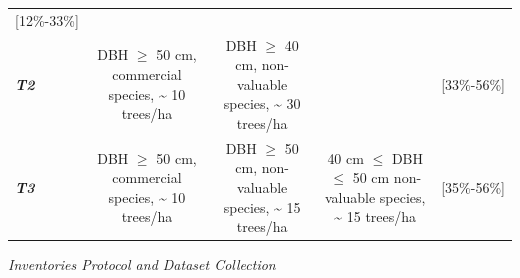 \documentclass[fleqn,10pt]{ArtEcoFoG} %
\begin{document}
\begin{longtable}[]{@{}lcccc@{}}
\begin{minipage}[t]{0.12\columnwidth}
{[}12\%-33\%{]}\strut
\end{minipage}\tabularnewline
\begin{minipage}[t]{0.14\columnwidth}\raggedright\strut
\textbf{\emph{T2}}\strut
\end{minipage} & \begin{minipage}[t]{0.17\columnwidth}\centering\strut
DBH \(\geq\) 50 cm, commercial species, \textasciitilde{} 10
trees/ha\strut
\end{minipage} & \begin{minipage}[t]{0.18\columnwidth}\centering\strut
DBH \(\geq\) 40 cm, non-valuable species, \textasciitilde{} 30
trees/ha\strut
\end{minipage} & \begin{minipage}[t]{0.24\columnwidth}\centering\strut
\strut
\end{minipage} & \begin{minipage}[t]{0.12\columnwidth}\centering\strut
{[}33\%-56\%{]}\strut
\end{minipage}\tabularnewline
\begin{minipage}[t]{0.14\columnwidth}\raggedright\strut
\textbf{\emph{T3}}\strut
\end{minipage} & \begin{minipage}[t]{0.17\columnwidth}\centering\strut
DBH \(\geq\) 50 cm, commercial species, \textasciitilde{} 10
trees/ha\strut
\end{minipage} & \begin{minipage}[t]{0.18\columnwidth}\centering\strut
DBH \(\geq\) 50 cm, non-valuable species, \textasciitilde{} 15
trees/ha\strut
\end{minipage} & \begin{minipage}[t]{0.24\columnwidth}\centering\strut
40 cm \(\leq\) DBH \(\leq\) 50 cm non-valuable species,
\textasciitilde{} 15 trees/ha\strut
\end{minipage} & \begin{minipage}[t]{0.12\columnwidth}\centering\strut
{[}35\%-56\%{]}\strut
\end{minipage}\tabularnewline
\bottomrule
\end{longtable}

\emph{Inventories Protocol and Dataset Collection}
\end{document}

